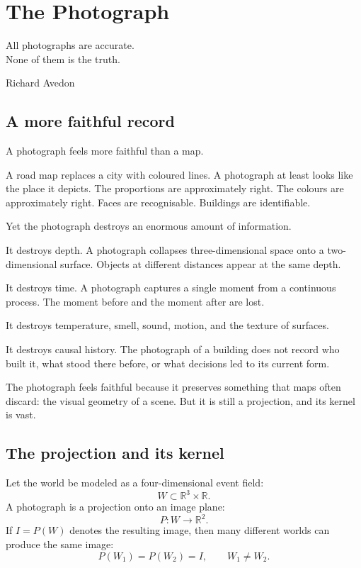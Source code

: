 
\chapter{The Photograph}
\label{ch:photograph}

\epigraph{%
  All photographs are accurate.\\
  None of them is the truth.%
}{Richard Avedon}

\section{A more faithful record}

A photograph feels more faithful than a map.

A road map replaces a city with coloured lines.
A photograph at least looks like the place it depicts.
The proportions are approximately right.
The colours are approximately right.
Faces are recognisable.
Buildings are identifiable.

Yet the photograph destroys an enormous amount of information.

It destroys depth.
A photograph collapses three-dimensional space onto a
two-dimensional surface.
Objects at different distances appear at the same depth.

It destroys time.
A photograph captures a single moment from a continuous process.
The moment before and the moment after are lost.

It destroys temperature, smell, sound, motion, and the
texture of surfaces.

It destroys causal history.
The photograph of a building does not record who built it,
what stood there before, or what decisions led to its current form.

The photograph feels faithful because it preserves something that
maps often discard: the visual geometry of a scene.
But it is still a projection, and its kernel is vast.

\section{The projection and its kernel}

Let the world be modeled as a four-dimensional event field:
\[
  W \subset \mathbb{R}^3 \times \mathbb{R}.
\]
A photograph is a projection onto an image plane:
\[
  P : W \to \mathbb{R}^2.
\]
If $I = P(W)$ denotes the resulting image, then many different
worlds can produce the same image:
\[
  P(W_1) = P(W_2) = I, \qquad W_1 \neq W_2.
\]

